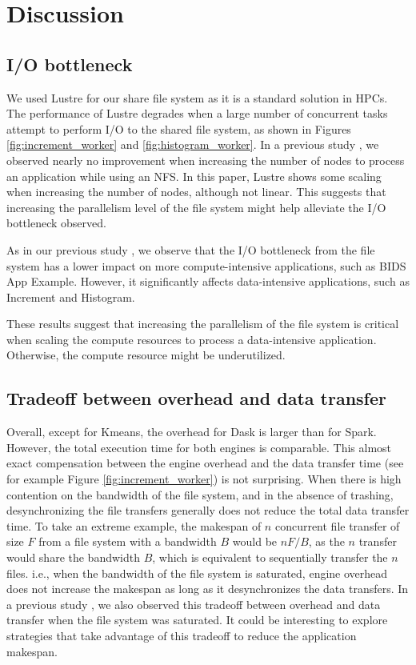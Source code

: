 \documentclass[conference]{IEEEtran}
\begin{document}
\section{Discussion}
\subsection{I/O bottleneck}
We used Lustre for our share file system as it is a standard solution in HPCs.
The performance of Lustre degrades when a large number of concurrent tasks attempt to perform I/O to the shared file system, as shown in Figures \ref{fig:increment_worker} and \ref{fig:histogram_worker}.
In a previous study \cite{8943502}, we observed nearly no improvement when increasing the number of nodes to process an application while using an NFS.
In this paper, Lustre shows some scaling when increasing the number of nodes, although not linear.
This suggests that increasing the parallelism level of the file system might help alleviate the I/O bottleneck observed.

As in our previous study \cite{8943502}, we observe that the I/O bottleneck from the file system has a lower impact on more compute-intensive applications, such as BIDS App Example.
However, it significantly affects data-intensive applications, such as Increment and Histogram.

These results suggest that increasing the parallelism of the file system is critical when scaling the compute resources to process a data-intensive application.
Otherwise, the compute resource might be underutilized.

\subsection{Tradeoff between overhead and data transfer}
Overall, except for Kmeans, the overhead for Dask is larger than for Spark.
However, the total execution time for both engines is comparable.
This almost exact compensation between the engine overhead and the data transfer time (see for example Figure \ref{fig:increment_worker}) is not surprising.
When there is high contention on the bandwidth of the file system, and in the absence of trashing, desynchronizing the file transfers generally does not reduce the total data transfer time.
To take an extreme example, the makespan of $n$ concurrent file transfer of size $F$ from a file system with a bandwidth $B$ would be $nF/B$,
as the $n$ transfer would share the bandwidth $B$, which is equivalent to sequentially transfer the $n$ files.
i.e., when the bandwidth of the file system is saturated, engine overhead does not increase the makespan as long as it desynchronizes the data transfers.
In a previous study \cite{8943502}, we also observed this tradeoff between overhead and data transfer when the file system was saturated.
It could be interesting to explore strategies that take advantage of this tradeoff to reduce the application makespan.
\end{document}
